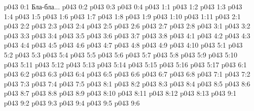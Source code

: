 \author{Малаватия Мелхиседек}
\vs p043 0:1  Бла-бла...
\vs p043 0:2 \pc 
\vs p043 0:3 \pc 
\vs p043 0:4 
\vs p043 1:1 
\vs p043 1:2 
\vs p043 1:3 
\vs p043 1:4 
\vs p043 1:5 \pc 
\vs p043 1:6 
\vs p043 1:7 \pc 
\vs p043 1:8 
\vs p043 1:9 
\vs p043 1:10 
\vs p043 1:11 
\vs p043 2:1 
\vs p043 2:2 
\vs p043 2:3 \pc 
\vs p043 2:4 
\vs p043 2:5 \pc 
\vs p043 2:6 
\vs p043 2:7 
\vs p043 2:8 
\vs p043 3:1 
\vs p043 3:2 \pc 
\vs p043 3:3 
\vs p043 3:4 \pc 
\vs p043 3:5 \pc 
\vs p043 3:6 
\vs p043 3:7 
\vs p043 3:8 
\vs p043 4:1 
\vs p043 4:2 
\vs p043 4:3 
\vs p043 4:4 
\vs p043 4:5 
\vs p043 4:6 
\vs p043 4:7 \pc 
\vs p043 4:8 
\vs p043 4:9 \pc 
\vs p043 4:10 
\vs p043 5:1 
\vs p043 5:2 
\vs p043 5:3 
\vs p043 5:4 
\vs p043 5:5 
\vs p043 5:6 
\vs p043 5:7 
\vs p043 5:8 
\vs p043 5:9 
\vs p043 5:10 
\vs p043 5:11 
\vs p043 5:12 
\vs p043 5:13 
\vs p043 5:14 
\vs p043 5:15 
\vs p043 5:16 \pc 
\vs p043 5:17 
\vs p043 6:1 
\vs p043 6:2 \pc 
\vs p043 6:3 
\vs p043 6:4 \pc 
\vs p043 6:5 
\vs p043 6:6 
\vs p043 6:7 
\vs p043 6:8 
\vs p043 7:1 
\vs p043 7:2 
\vs p043 7:3 
\vs p043 7:4 
\vs p043 7:5 
\vs p043 8:1 
\vs p043 8:2 
\vs p043 8:3 
\vs p043 8:4 
\vs p043 8:5 
\vs p043 8:6 
\vs p043 8:7 
\vs p043 8:8 
\vs p043 8:9 
\vs p043 8:10 
\vs p043 8:11 
\vs p043 8:12 \pc 
\vs p043 8:13 
\vs p043 9:1 
\vs p043 9:2 \pc 
\vs p043 9:3 
\vs p043 9:4 \pc 
\vs p043 9:5 
\vsetoff
\vs p043 9:6 
\quizlink
